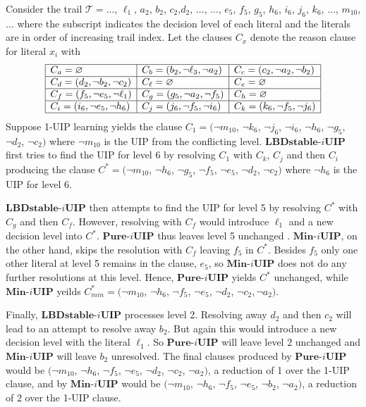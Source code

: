 \documentclass[runningheads]{llncs}
\newcommand{\oneUIPClause}{\ensuremath{C_{1}}}
\newcommand{\assertionTrail}{\trail}
\newcommand{\IUIP}{\textbf{LBDstable-$i$UIP}}
\newcommand{\IUIPPURE}{\textbf{Pure-$i$UIP}}
\newcommand{\IUIPMIN}{\textbf{Min-$i$UIP}}
\newcommand{\trail}{\ensuremath{\mathcal{T}}}
\newcommand{\whitebox}{\raisebox{.5ex}{\fbox{\hspace*{.2ex}}}}
\begin{document}
\begin{example}
    Consider the trail $\assertionTrail = \ldots$, $\ell_1$, $a_2$, $b_2$,
    $c_2$,$d_2$, $\ldots$, $\ldots$, $e_5$, $f_5$, $g_5$,
    $h_6$, $i_6$, $j_6$, $k_6$, $\ldots$, $m_{10}$,
    $\ldots$ where the subscript indicates the decision level of each
    literal and the literals are in order of increasing trail
    index. Let the clauses
    $C_x$ denote the reason clause for literal $x_i$ with 
    \[\begin{array}{|l|l|l|}\hline
      C_{a} = \varnothing 
      & C_{b} =  (b_2, \lnot \ell_3, \lnot a_2)
      & C_{c} =  (c_2, \lnot a_2, \lnot b_2) \\\hline
      C_{d} =  (d_2, \lnot b_2, \lnot c_2) 
      & C_{\ell} =\varnothing
      & C_{e} =\varnothing \\\hline
      C_{f} =  (f_5, \lnot e_5,\lnot \ell_1)
      & C_{g} = (g_5, \lnot a_2, \lnot f_5)
      & C_{h} =\varnothing \\\hline
      C_{i} =  (i_6, \lnot e_5, \lnot h_6)
      & C_{j} = (j_6, \lnot f_5, \lnot i_6 )
      & C_{k} = (k_6, \lnot f_5, \lnot j_6) \\\hline
      \end{array}
  \]
  Suppose 1-UIP learning yields the clause
  $\oneUIPClause = (\neg{m_{10}}$, $\neg{k_6}$, $\neg{j_6}$, $\neg{i_6}$,
  $\neg{h_6}$, $\neg{g_5}$, $\neg{d_2}$, $\neg{c_2})$ where $\neg{m_{10}}$
  is the UIP from the conflicting level. $\IUIP$ first tries to find
  the UIP for level 6 by resolving $\oneUIPClause$ with $C_k$, $C_j$
  and then $C_i$ producing the clause
  $C^* = (\neg{m_{10}}$, $\neg{h_6}$, $\neg{g_5}$,
  $\neg{f_5}$, $\neg{e_5}$, $\neg{d_2}$, $\neg{c_2})$ where
  $\neg{h_6}$ is the UIP for level 6.

  $\IUIP$ then attempts to find the UIP for level 5 by resolving $C^*$
  with $C_g$ and then $C_f$. However, resolving with $C_f$ would
  introduce $\ell_1$ and a new decision level into $C^*$. $\IUIPPURE$
  thus leaves level 5 unchanged . $\IUIPMIN$, on the other hand, skips
  the resolution with $C_f$  leaving $f_5$ in $C^*$. Besides $f_5$
  only one other literal at level 5 remains in the clause, $e_5$,
  so $\IUIPMIN$ does not do any further resolutions at this level. Hence,
  $\IUIPPURE$ yields $C^*$ unchanged, while $\IUIPMIN$ yeilds
  $C^*_{\mathit{min}} = (\neg{m_{10}}$, $\neg{h_6}$, $\neg{f_5}$,
  $\neg{e_5}$, $\neg{d_2}$, $\neg{c_2}, \lnot a_2)$.

  Finally, $\IUIP$ processes level 2. Resolving away $d_2$ and then
  $c_2$ will lead to an attempt to resolve away $b_2$. But again this
  would introduce a new decision level with the literal $\ell_1$. So
  $\IUIPPURE$ will leave level 2 unchanged and $\IUIPMIN$ will leave
  $b_2$ unresolved. The final clauses produced by $\IUIPPURE$ would be
  $(\neg{m_{10}}$, $\neg{h_6}$, $\neg{f_5}$, $\neg{e_5}$, $\neg{d_2}$,
  $\neg{c_2}$, $\neg{a_2})$, a reduction of 1 over the 1-UIP clause,
  and by $\IUIPMIN$ would be $(\neg{m_{10}}$, $\neg{h_6}$,
  $\neg{f_5}$, $\neg{e_5}$, $\neg{b_2}$, $\neg{a_2})$, a reduction of
  2 over the 1-UIP clause.
\whitebox
\end{example}
\end{document}
